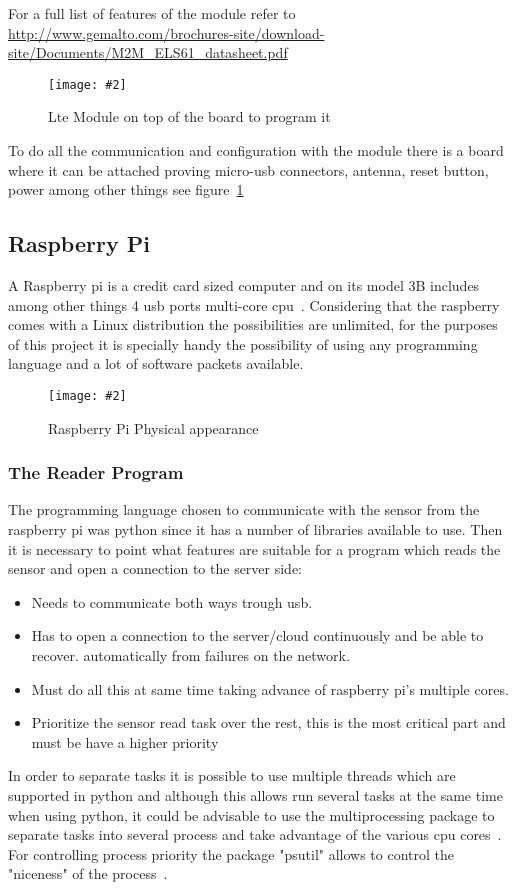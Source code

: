 \documentclass[hidelinks,11pt,a4paper,oneside,article]{memoir}
\newcommand{\putimage}[3][10] %
{
\begin{figure}[h]
	\centering
	\captionsetup{justification=centering}
	\texttt{[image: \#2]}
	\caption{#3}
	\label{fig:#2}
\end{figure}
}
\begin{document}
For a full list of features of the module refer to \url{http://www.gemalto.com/brochures-site/download-site/Documents/M2M_ELS61_datasheet.pdf}


	\putimage{lte_board}{Lte Module on top of the board to program it}
To do all the communication and configuration with the module there is a board where it can be attached proving micro-usb connectors, antenna, reset button, power among other things see figure~\ref{fig:lte_board}





\subsection{Raspberry Pi}
A Raspberry pi is a credit card sized computer and on its model 3B includes among other things 4 \gls{usb} ports multi-core \gls{cpu}~\cite{rpi3}. Considering that the raspberry comes with a Linux distribution the possibilities are unlimited, for the purposes of this project it is specially handy the possibility of using any programming language and a lot of software packets available.

\putimage{raspberry}{Raspberry Pi Physical appearance}

\subsubsection{The Reader Program}
The programming language chosen to communicate with the sensor from the raspberry pi was \gls{python} since it has a number of libraries available to use. Then it is necessary to point what features are suitable for a program which reads the sensor and open a connection to the server side:
\begin{itemize}
    \item Needs to communicate both ways trough \gls{usb}.
    \item Has to open a connection to the server/cloud continuously and be able to recover. automatically from failures on the network.
    \item Must do all this at same time taking advance of raspberry pi's multiple cores.
    \item Prioritize the sensor read task over the rest, this is the most critical part and must be have a higher priority
\end{itemize}



In order to separate tasks it is possible to use multiple threads which are supported in \gls{python} and although this allows run several tasks at the same time when using python, it could be advisable to use the multiprocessing package to separate tasks into several process and take advantage of the various \gls{cpu} cores~\cite{python-multi}. For controlling process priority the package "psutil" allows to control the "niceness" of the process~\cite{python-psutil}.
\end{document}
